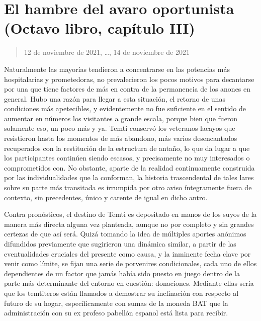 \documentclass[
]{book}
\begin{document}
\hypertarget{el-hambre-del-avaro-oportunista-octavo-libro-capuxedtulo-iii}{%
\section{El hambre del avaro oportunista (Octavo libro, capítulo III)}\label{el-hambre-del-avaro-oportunista-octavo-libro-capuxedtulo-iii}}

\begin{quote}
12 de noviembre de 2021, \ldots, 14 de noviembre de 2021
\end{quote}

Naturalmente las mayorías tendieron a concentrarse en las potencias más hospitalarias y prometedoras, no prevalecieron los pocos motivos para decantarse por una que tiene factores de más en contra de la permanencia de los anones en general. Hubo una razón para llegar a esta situación, el retorno de unas condiciones más apetecibles, y evidentemente no fue suficiente en el sentido de aumentar en números los visitantes a grande escala, porque bien que fueron solamente eso, un poco más y ya. Temti conservó los veteranos lacayos que resistieron hasta los momentos de más abandono, más varios desencantados recuperados con la restitución de la estructura de antaño, lo que da lugar a que los participantes continúen siendo escasos, y precisamente no muy interesados o comprometidos con. No obstante, aparte de la realidad continuamente construida por las individualidades que la conforman, la historia trascendental de tales lares sobre su parte más transitada es irrumpida por otro aviso íntegramente fuera de contexto, sin precedentes, único y carente de igual en dicho antro.

Contra pronósticos, el destino de Temti es depositado en manos de los suyos de la manera más directa alguna vez planteada, aunque no por completo y sin grandes certezas de que así será. Quizá tomando la idea de múltiples aportes anónimos difundidos previamente que sugirieron una dinámica similar, a partir de las eventualidades cruciales del presente como causa, y la inminente fecha clave por venir como límite, se fijan una serie de porvenires condicionales, cada uno de ellos dependientes de un factor que jamás había sido puesto en juego dentro de la parte más determinante del entorno en cuestión: donaciones. Mediante ellas sería que los temtiteros están llamados a demostrar su inclinación con respecto al futuro de su hogar, específicamente con sumas de la moneda BAT que la administración con su ex profeso pabellón espanol está lista para recibir.
\end{document}
